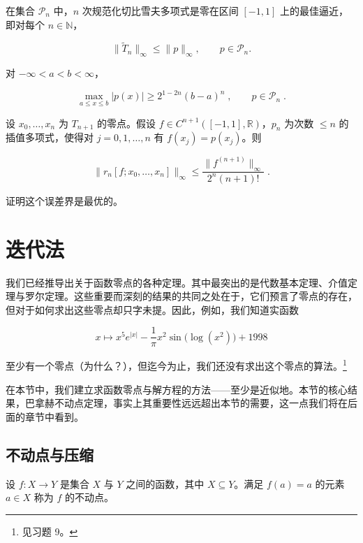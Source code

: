 \begin{exercises}
\begin{items}
在集合 $ \mathcal{P}_n $ 中，$ n $ 次规范化切比雪夫多项式是零在区间 $ [-1,1] $ 上的最佳逼近，即对每个 $ n \in \mathbb{N} $，

\[
\|\widetilde{T}_{n}\|_{\infty}\leq\|p\|_{\infty},\qquad p\in\mathcal{P}_{n}.
\]
\item

对 $ -\infty < a < b < \infty $，

\[
\operatorname*{m a x}_{a\leq x\leq b}|p(x)|\geq2^{1-2n}(b-a)^{n}\;,\qquad p\in\mathcal{P}_{n}\;.
\]
\item

设 $ x_0, \ldots, x_n $ 为 $ T_{n+1} $ 的零点。假设 $ f \in C^{n+1}([-1,1], \mathbb{R}) $，$ p_n $ 为次数 $ \leq n $ 的插值多项式，使得对 $ j = 0,1,\ldots,n $ 有 $ f(x_j) = p(x_j) $。则

\[
\|r_{n}[f;x_{0},\ldots,x_{n}]\|_\infty\leq\frac{\|f^{(n+1)}\|_\infty}{2^{n}(n+1)!}\;.
\]

证明这个误差界是最优的。

\end{items}

\end{exercises}

\section{迭代法}

我们已经推导出关于函数零点的各种定理。其中最突出的是代数基本定理、介值定理与罗尔定理。这些重要而深刻的结果的共同之处在于，它们预言了零点的存在，但对于如何求出这些零点却只字未提。因此，例如，我们知道实函数

\[
x\mapsto x^{5}e^{|x|}-\frac{1}{\pi}x^{2}\sin\bigl(\log(x^{2})\bigr)+1998
\]

至少有一个零点（为什么？），但迄今为止，我们还没有求出这个零点的算法。\footnote{见习题 9。}

在本节中，我们建立求函数零点与解方程的方法——至少是近似地。本节的核心结果，巴拿赫不动点定理，事实上其重要性远远超出本节的需要，这一点我们将在后面的章节中看到。

\subsection*{不动点与压缩}

设 $f: X \to Y$ 是集合 $X$ 与 $Y$ 之间的函数，其中 $X \subseteq Y$。满足 $f(a) = a$ 的元素 $a \in X$ 称为 $f$ 的不动点。


